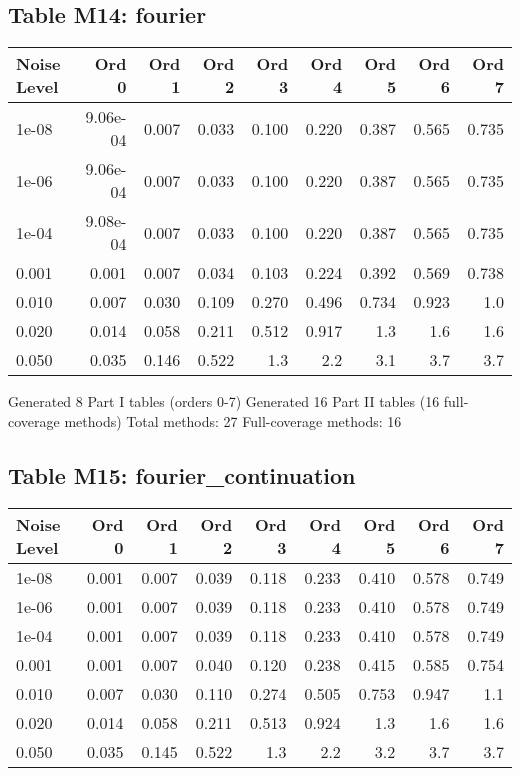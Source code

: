 \documentclass[10pt]{article}
\begin{document}
\clearpage

\subsection*{Table M14: fourier}

\begin{longtable}{lrrrrrrrr}
\toprule
\textbf{Noise Level} & \textbf{Ord 0} & \textbf{Ord 1} & \textbf{Ord 2} & \textbf{Ord 3} & \textbf{Ord 4} & \textbf{Ord 5} & \textbf{Ord 6} & \textbf{Ord 7} \\
\midrule
\endhead
1e-08 & 9.06e-04 & 0.007 & 0.033 & 0.100 & 0.220 & 0.387 & 0.565 & 0.735 \\
1e-06 & 9.06e-04 & 0.007 & 0.033 & 0.100 & 0.220 & 0.387 & 0.565 & 0.735 \\
1e-04 & 9.08e-04 & 0.007 & 0.033 & 0.100 & 0.220 & 0.387 & 0.565 & 0.735 \\
0.001 & 0.001 & 0.007 & 0.034 & 0.103 & 0.224 & 0.392 & 0.569 & 0.738 \\
0.010 & 0.007 & 0.030 & 0.109 & 0.270 & 0.496 & 0.734 & 0.923 & 1.0 \\
0.020 & 0.014 & 0.058 & 0.211 & 0.512 & 0.917 & 1.3 & 1.6 & 1.6 \\
0.050 & 0.035 & 0.146 & 0.522 & 1.3 & 2.2 & 3.1 & 3.7 & 3.7 \\
\bottomrule
\end{longtable}

\clearpage

Generated 8 Part I tables (orders 0-7)
Generated 16 Part II tables (16 full-coverage methods)
Total methods: 27
Full-coverage methods: 16
\subsection*{Table M15: fourier\_continuation}

\begin{longtable}{lrrrrrrrr}
\toprule
\textbf{Noise Level} & \textbf{Ord 0} & \textbf{Ord 1} & \textbf{Ord 2} & \textbf{Ord 3} & \textbf{Ord 4} & \textbf{Ord 5} & \textbf{Ord 6} & \textbf{Ord 7} \\
\midrule
\endhead
1e-08 & 0.001 & 0.007 & 0.039 & 0.118 & 0.233 & 0.410 & 0.578 & 0.749 \\
1e-06 & 0.001 & 0.007 & 0.039 & 0.118 & 0.233 & 0.410 & 0.578 & 0.749 \\
1e-04 & 0.001 & 0.007 & 0.039 & 0.118 & 0.233 & 0.410 & 0.578 & 0.749 \\
0.001 & 0.001 & 0.007 & 0.040 & 0.120 & 0.238 & 0.415 & 0.585 & 0.754 \\
0.010 & 0.007 & 0.030 & 0.110 & 0.274 & 0.505 & 0.753 & 0.947 & 1.1 \\
0.020 & 0.014 & 0.058 & 0.211 & 0.513 & 0.924 & 1.3 & 1.6 & 1.6 \\
0.050 & 0.035 & 0.145 & 0.522 & 1.3 & 2.2 & 3.2 & 3.7 & 3.7 \\
\bottomrule
\end{longtable}
\end{document}
